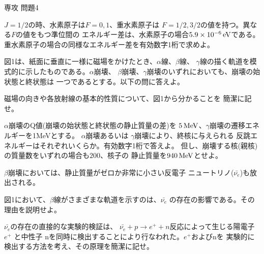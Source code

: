 \documentclass[fleqn]{jbook}
\begin{document}
\begin{question}{専攻 問題4}{}
\begin{subquestions}
\begin{subsubquestions}
    $J=1/2$の時、水素原子は$F=0,1$、重水素原子は
    $F=1/2,3/2$の値を持つ。異なる$F$の値をもつ準位間の
    エネルギー差は、水素原子の場合$5.9\times 10^{-6}\,{\rm eV}$である。
    重水素原子の場合の同様なエネルギー差を有効数字1桁で求めよ。


  \end{subsubquestions}

\SubQuestion
  図1は、紙面に垂直に一様に磁場をかけたとき、$\alpha$線、$\beta$線、
  $\gamma$線の描く軌道を模式的に示したものである。$\alpha$崩壊、
  $\beta$崩壊、$\gamma$崩壊のいずれにおいても、崩壊の始状態と終状態は
  一つであるとする。以下の問に答えよ。

  \begin{subsubquestions}
  \SubSubQuestion
    磁場の向きや各放射線の基本的性質について、図1から分かることを
    簡潔に記せ。

  \parbox[t]{100mm}{
  \SubSubQuestion
    $\alpha$崩壊のQ値(崩壊の始状態と終状態の静止質量の差)を
    $5\,{\rm MeV}$、$\gamma$崩壊の遷移エネルギーを1MeVとする。
    $\alpha$崩壊あるいは $\gamma$崩壊により、終核に与えられる
    反跳エネルギーはそれぞれいくらか。有効数字1桁で答えよ。
    但し、崩壊する核(親核)の質量数をいずれの場合も$200$、核子の
    静止質量を$940\,{\rm MeV}$とせよ。

  \SubSubQuestion
    $\beta$崩壊においては、静止質量がゼロか非常に小さい反電子
    ニュートリノ($\bar{\nu_e}$)も放出される。

     図1において、$\beta$線がさまざまな軌道を示すのは、$\bar{\nu_e}$
     の存在の影響である。その理由を説明せよ。

     $\bar{\nu_e}$の存在の直接的な実験的検証は、
     $\bar{\nu_e}+p\rightarrow e^++n$反応によって生じる陽電子$e^+$
     と中性子 nを同時に検出することにより行なわれた。$e^+$およびnを
     実験的に検出する方法を考え、その原理を簡潔に記せ。

}
\end{subsubquestions}
\end{subquestions}
\end{question}
\end{document}
